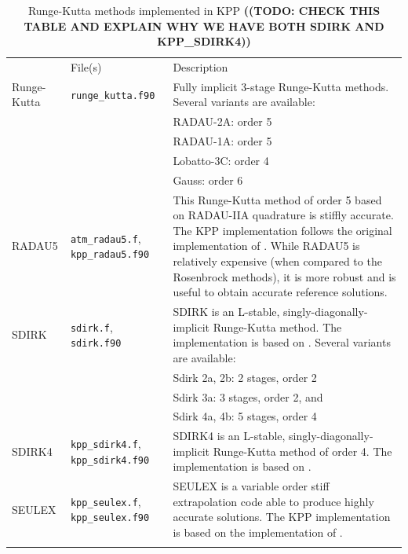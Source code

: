 \documentclass[twoside]{article}
\newcommand{\hhline}{\noalign{\vspace{1mm}}\hline\noalign{\vspace{1mm}}}
\newcommand{\todo}[1]{{{\color{red}\uppercase{\bf ((TODO: #1))}}}}
\begin{document}
\begin{table}
\begin{center}
\caption{Runge-Kutta methods implemented in KPP \todo{check
  this table and explain why we have both sdirk and kpp\_sdirk4} }
\label{tab:Runge-Kutta}
\begin{tabular}{lp{2.5cm}p{10cm}}
  \hhline
  \multicolumn{1}{c}{Method} & File(s) & Description\\
  \hhline
  Runge-Kutta & {\tt runge\_kutta.f90} &
  Fully implicit 3-stage Runge-Kutta methods.
  Several variants are available:\\
  & & RADAU-2A:   order 5\\
  & & RADAU-1A:   order 5\\
  & & Lobatto-3C: order 4\\
  & & Gauss:      order 6\\
  RADAU5 & {\tt atm\_radau5.f}, {\tt kpp\_radau5.f90} &
  This Runge-Kutta method of order 5 based on RADAU-IIA quadrature
  \citep[Section IV.10]{k:HW2} is stiffly accurate. The KPP implementation
  follows the original implementation of \citet{k:HW2}. While RADAU5 is
  relatively expensive (when compared to the Rosenbrock methods), it is
  more robust and is useful to obtain accurate reference solutions.\\
  SDIRK & {\tt sdirk.f}, {\tt sdirk.f90} &
  SDIRK is an L-stable, singly-diagonally-implicit Runge-Kutta method.
  The implementation is based on \citet{k:HW2}.
  Several variants are available:\\
  & & Sdirk 2a, 2b: 2 stages, order 2\\
  & & Sdirk 3a:     3 stages, order 2, and\\
  & & Sdirk 4a, 4b: 5 stages, order 4\\
  SDIRK4 & {\tt kpp\_sdirk4.f}, {\tt kpp\_sdirk4.f90} &
  SDIRK4 is an L-stable, singly-diagonally-implicit Runge-Kutta method of
  order 4. The implementation is based on \citet{k:HW2}.\\
  SEULEX & {\tt kpp\_seulex.f}, {\tt kpp\_seulex.f90} &
  SEULEX is a variable order stiff extrapolation code able to produce highly
  accurate solutions. The KPP implementation is based on the implementation
  of \citet{k:HW2}.\\
  \hhline
\end{tabular}
\end{center}
\end{table}

\end{document}
